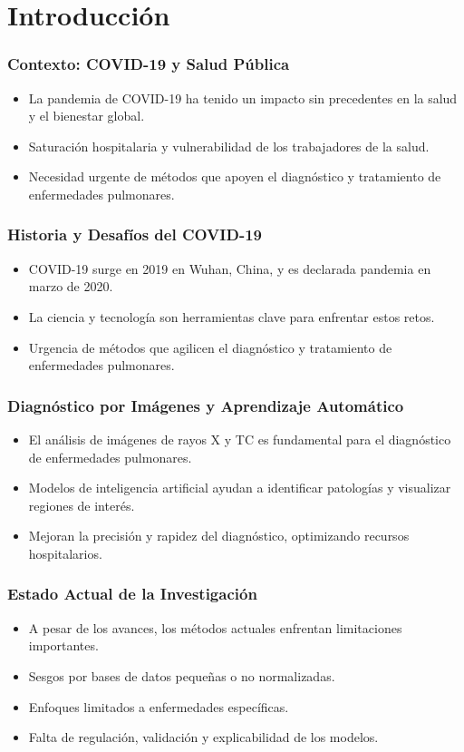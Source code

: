 
\section{Introducción}

\begin{frame}
\frametitle{Contexto: COVID-19 y Salud Pública}
\begin{itemize}
    \item La pandemia de COVID-19 ha tenido un impacto sin precedentes en la salud y el bienestar global.
    \item Saturación hospitalaria y vulnerabilidad de los trabajadores de la salud.
    \item Necesidad urgente de métodos que apoyen el diagnóstico y tratamiento de enfermedades pulmonares.
\end{itemize}
\end{frame}

\begin{frame}
\frametitle{Historia y Desafíos del COVID-19}
\begin{itemize}
    \item COVID-19 surge en 2019 en Wuhan, China, y es declarada pandemia en marzo de 2020.
    \item La ciencia y tecnología son herramientas clave para enfrentar estos retos.
    \item Urgencia de métodos que agilicen el diagnóstico y tratamiento de enfermedades pulmonares.
\end{itemize}
\end{frame}

\begin{frame}
\frametitle{Diagnóstico por Imágenes y Aprendizaje Automático}
\begin{itemize}
    \item El análisis de imágenes de rayos X y TC es fundamental para el diagnóstico de enfermedades pulmonares.
    \item Modelos de inteligencia artificial ayudan a identificar patologías y visualizar regiones de interés.
    \item Mejoran la precisión y rapidez del diagnóstico, optimizando recursos hospitalarios.
\end{itemize}
\end{frame}

\begin{frame}
\frametitle{Estado Actual de la Investigación}
\begin{itemize}
    \item A pesar de los avances, los métodos actuales enfrentan limitaciones importantes.
    \item Sesgos por bases de datos pequeñas o no normalizadas.
    \item Enfoques limitados a enfermedades específicas.
    \item Falta de regulación, validación y explicabilidad de los modelos.
\end{itemize}
\end{frame}
